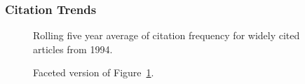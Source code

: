 \documentclass[
  10pt,
  letterpaper,
  DIV=11,
  numbers=noendperiod,
  twoside]{scrartcl}
\begin{document}
\subsubsection*{Citation Trends}\label{sec-trends-1994}

\begin{figure}


\caption{\label{fig-citation-spaghetti-1994}Rolling five year average of
citation frequency for widely cited articles from 1994.}

\end{figure}%

\begin{figure}


\caption{\label{fig-citation-facet-1994}Faceted version of
Figure~\ref{fig-citation-spaghetti-1994}.}

\end{figure}%
\end{document}
